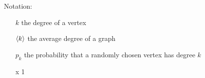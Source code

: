 Notation:


\begin{itemize}
	\item[$k$] the degree of a vertex
	\item[$\left< k \right>$] the average degree of a graph
	\item[$p_k$] the probability that a randomly chosen vertex has degree $k$
	\item[x] 1 
\end{itemize}
